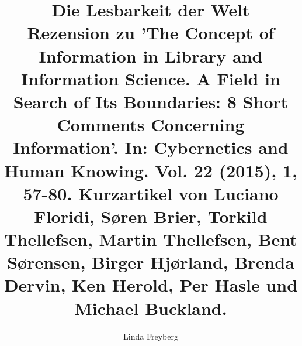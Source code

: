 
\fancyhead[R]{\thepage} %

\title{\LARGE{Die Lesbarkeit der Welt} \\ Rezension zu 'The Concept of Information in Library and Information Science. A Field in Search of Its Boundaries: 8 Short Comments Concerning Information'. In: Cybernetics and Human Knowing. Vol. 22 (2015), 1, 57-80. Kurzartikel von Luciano Floridi, Søren Brier, Torkild Thellefsen, Martin Thellefsen, Bent Sørensen, Birger Hjørland, Brenda Dervin, Ken Herold, Per Hasle und Michael Buckland.} %
\author{Linda Freyberg} %

\setcounter{page}{1}
